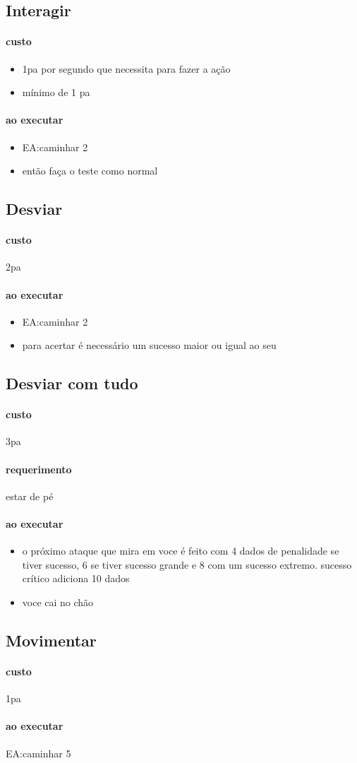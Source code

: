 \subsection{Interagir}
\paragraph{custo}
\begin{itemize}
  \item 1pa por segundo que necessita para fazer a ação
  \item mínimo de 1 pa
\end{itemize}
\paragraph{ao executar}
\begin{itemize}
  \item EA:caminhar 2 
  \item então faça o teste como normal
\end{itemize}
%
\subsection{Desviar}
\paragraph{custo} 2pa
\paragraph{ao executar}
\begin{itemize}
  \item EA:caminhar 2
  \item para acertar é necessário um sucesso maior ou igual ao seu
\end{itemize}
%
\subsection{Desviar com tudo}
\paragraph{custo} 3pa
\paragraph{requerimento} estar de pé 
\paragraph{ao executar} 
\begin{itemize}
  \item o próximo ataque que mira em voce é feito com 4 dados de penalidade se tiver sucesso, 
    6 se tiver sucesso grande e 8 com um sucesso extremo. sucesso crítico adiciona 10 dados %
  \item voce cai no chão
\end{itemize}
%
\subsection{Movimentar}
\paragraph{custo} 1pa
\paragraph{ao executar} EA:caminhar 5
